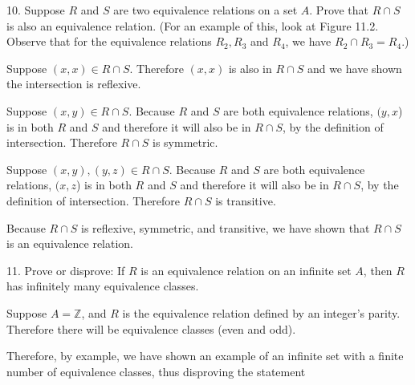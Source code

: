 \documentclass{article}
\begin{document}
\begin{exercise}{}{}{10. Suppose $R$ and $S$ are two equivalence relations on a set
		$A$. Prove that $R \cap S$ is also an equivalence relation. (For an example
		of this, look at Figure 11.2. Observe that for the equivalence relations $R_2,
			R_3$ and $R_4$, we have $R_2 \cap R_3=R_4$.)}
	\begin{alist}
		\item Suppose $(x, x) \in R\cap S$. Therefore $(x, x)$ is also in $R \cap S$ and
		we have shown the intersection is reflexive.
		\item Suppose $(x, y) \in R\cap S$.  Because $R$ and $S$ are both equivalence
		relations, $(y, x$) is in both $R$ and $S$ and therefore it will also be in
		$R\cap S$, by the definition of intersection. Therefore $R\cap S$ is
		symmetric.
		\item Suppose $(x, y), (y, z) \in R\cap S$.  Because $R$ and $S$ are both equivalence
		relations, $(x, z$) is in both $R$ and $S$ and therefore it will also be in
		$R\cap S$, by the definition of intersection. Therefore $R\cap S$ is
		transitive.
		\item Because $R\cap S$ is reflexive, symmetric, and transitive, we have shown
		that $R\cap S$ is an equivalence relation.
	\end{alist}
\end{exercise}{}{}

\begin{exercise}{}{}{11. Prove or disprove: If $R$ is an equivalence relation on an
		infinite set $A$, then $R$ has infinitely many equivalence classes.}
	\begin{alist}
		\item Suppose $A=\mathbb{Z}$, and $R$ is the equivalence relation defined by an
		integer's parity. Therefore there will be equivalence classes (even and
		odd).
		\item Therefore, by example, we have shown an example of an infinite set with a
		finite number of equivalence classes, thus disproving the statement
	\end{alist}
\end{exercise}{}{}
\end{document}
